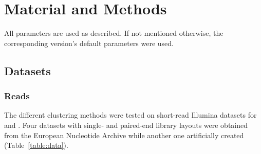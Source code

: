 \documentclass[12pt,a4paper,english]{article}
\begin{document}
\newpage
\section{Material and Methods}
	All parameters are used as described. If not mentioned otherwise, the corresponding version's default parameters were used.

\subsection{Datasets}
\subsubsection*{Reads}
	The different clustering methods were tested on short-read Illumina datasets for \ecoli and \celegans. Four datasets with single- and paired-end library layouts were obtained from the European Nucleotide Archive while another one artificially created (Table~\ref{table:data}).
	
\end{document}
